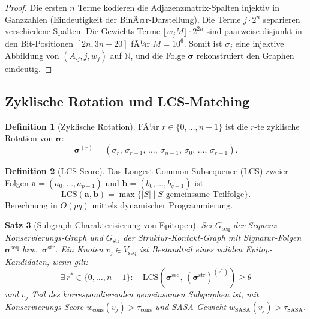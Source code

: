 ﻿\documentclass[a4paper,12pt]{article}
\theoremstyle{plain}
\newtheorem{satz}{Satz}[section]
\theoremstyle{definition}
\newtheorem{definition}[satz]{Definition}
\theoremstyle{remark}
\begin{document}
\begin{proof}
Die ersten $n$ Terme kodieren die Adjazenzmatrix-Spalten injektiv in Ganzzahlen
(Eindeutigkeit der BinÃ¤r-Darstellung). Die Terme $j\cdot 2^n$ separieren verschiedene
Spalten. Die Gewichts-Terme $\lfloor w_j M\rfloor\cdot 2^{2n}$ sind paarweise disjunkt
in den Bit-Positionen $[2n, 3n+20]$ fÃ¼r $M=10^6$. Somit ist $\sigma_j$ eine injektive
Abbildung von $(A_{\cdot j}, j, w_j)$ auf $\mathbb{N}$, und die Folge
$\boldsymbol{\sigma}$ rekonstruiert den Graphen eindeutig.
\end{proof}

\subsection{Zyklische Rotation und LCS-Matching}

\begin{definition}[Zyklische Rotation]
FÃ¼r $r\in\{0,\ldots,n-1\}$ ist die $r$-te zyklische Rotation von $\boldsymbol{\sigma}$:
\[
  \boldsymbol{\sigma}^{(r)} = (\sigma_r,\,\sigma_{r+1},\,\ldots,\,\sigma_{n-1},\,
                                \sigma_0,\,\ldots,\,\sigma_{r-1}).
\]
\end{definition}

\begin{definition}[LCS-Score]
Das Longest-Common-Subsequence (LCS) zweier Folgen $\mathbf{a}=(a_0,\ldots,a_{p-1})$
und $\mathbf{b}=(b_0,\ldots,b_{q-1})$ ist
\[
  \text{LCS}(\mathbf{a},\mathbf{b}) = \max\{|S|\mid S \text{ gemeinsame Teilfolge}\}.
\]
Berechnung in $O(pq)$ mittels dynamischer Programmierung.
\end{definition}

\begin{satz}[Subgraph-Charakterisierung von Epitopen]\label{satz:epitop}
Sei $G_{\text{seq}}$ der Sequenz-Konservierungs-Graph und $G_{\text{str}}$ der
Struktur-Kontakt-Graph mit Signatur-Folgen $\boldsymbol{\sigma}^{\text{seq}}$
bzw.\ $\boldsymbol{\sigma}^{\text{str}}$. Ein Knoten $v_j \in V_{\text{seq}}$ ist
Bestandteil eines \emph{validen Epitop-Kandidaten}, wenn gilt:
\[
  \exists\, r^* \in \{0,\ldots,n-1\}:\quad
  \text{LCS}\!\left(\boldsymbol{\sigma}^{\text{seq}},\,
  (\boldsymbol{\sigma}^{\text{str}})^{(r^*)}\right) \geq \theta
\]
und $v_j$ Teil des korrespondierenden gemeinsamen Subgraphen ist,
mit Konservierungs-Score $w_{\text{cons}}(v_j) > \tau_{\text{cons}}$ und
SASA-Gewicht $w_{\text{SASA}}(v_j) > \tau_{\text{SASA}}$.
\end{satz}
\end{document}
